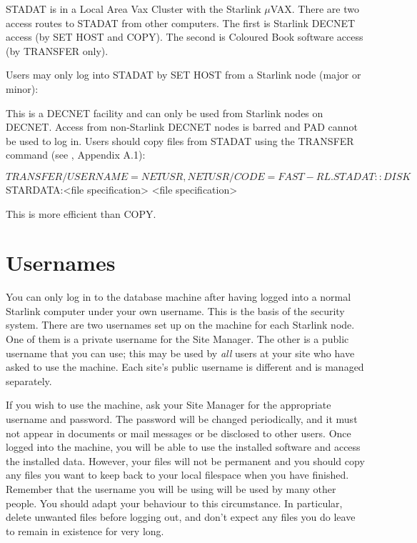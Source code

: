 \documentclass[nolof,11pt,noabs]{starlink}
\begin{document}
STADAT is  in a Local Area Vax Cluster with the Starlink $\mu$VAX.
There are two access routes to STADAT from other computers.
The first is Starlink DECNET access (by SET HOST and COPY).
The second is Coloured Book software access (by TRANSFER only).

Users may only log into STADAT by SET HOST from a Starlink node
(major or minor):
This is a DECNET facility and can only be used from Starlink nodes on DECNET.
Access from non-Starlink DECNET nodes is barred and PAD cannot be used
to log in.
Users should copy files from STADAT using the TRANSFER command (see ,
Appendix A.1):
\begin{terminalv}
$ TRANSFER/USERNAME=NETUSR,NETUSR/CODE=FAST -
     RL.STADAT::DISK$STARDATA:<file specification>  <file specification>
\end{terminalv}
This is more efficient than COPY.



\section{Usernames}

You can only log in to
the database machine after having logged into a
normal Starlink computer under your own username.
This is the basis of the security system.
There are two usernames set up on the machine for each
Starlink node.
One of them is a private username for the Site Manager.
The other is a public username that you can use; this may be used
by \emph{all} users at your site who have asked to use the machine.
Each site's public username is different and is managed separately.

If you wish to use the machine, ask your Site Manager for the appropriate
username and password.
The password will be changed periodically, and it must not appear in documents
or mail messages or be disclosed to other users.
Once logged into the machine, you will be able to use the installed software and
access the installed data.
However, your files will not be permanent and you should copy any files you
want to keep back to your local filespace when you have finished.
Remember that the username you will be using will be used by many other
people.
You should adapt your behaviour to this circumstance.
In particular, delete unwanted files before logging out, and don't expect
any files you do leave to remain in existence for very long.
\end{document}
